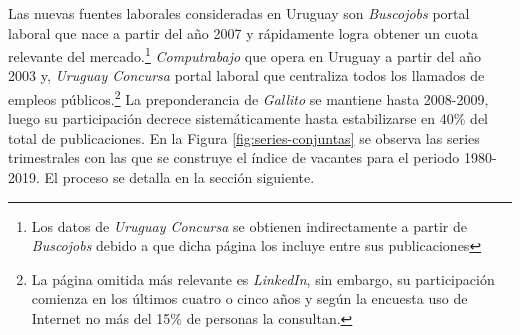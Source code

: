 \documentclass[12pt,oneside]{reedthesis}
\begin{document}
Las nuevas fuentes laborales consideradas en Uruguay son \emph{Buscojobs} portal laboral que nace a partir del año 2007 y rápidamente logra obtener un cuota relevante del mercado.\footnote{Los datos de \emph{Uruguay Concursa} se obtienen indirectamente a partir de \emph{Buscojobs} debido a que dicha página los incluye entre sus publicaciones} \emph{Computrabajo} que opera en Uruguay a partir del año 2003 y, \emph{Uruguay Concursa} portal laboral que centraliza todos los llamados de empleos públicos.\footnote{La página omitida más relevante es \emph{LinkedIn}, sin embargo, su participación comienza en los últimos cuatro o cinco años y según la encuesta uso de Internet no más del 15\% de personas la consultan.} La preponderancia de \emph{Gallito} se mantiene hasta 2008-2009, luego su participación decrece sistemáticamente hasta estabilizarse en 40\% del total de publicaciones.
En la Figura \ref{fig:series-conjuntas} se observa las series trimestrales con las que se construye el índice de vacantes para el periodo 1980-2019. El proceso se detalla en la sección siguiente.
\end{document}
